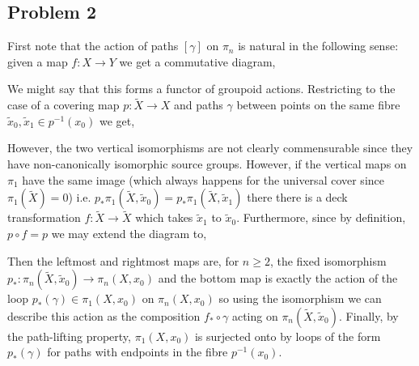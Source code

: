 \documentclass[12pt]{extarticle}
\begin{document}
\subsection{Problem 2}

First note that the action of paths $[\gamma]$ on $\pi_n$ is natural in the following sense: given a map $f : X \to Y$ we get a commutative diagram,
\begin{center}
\end{center}
We might say that this forms a functor of groupoid actions. Restricting to the case of a covering map $p : \tilde{X} \to X$ and paths $\gamma$ between points on the same fibre $\tilde{x}_0, \tilde{x}_1 \in p^{-1}(x_0)$ we get,
\begin{center}
\end{center}
However, the two vertical isomorphisms are not clearly commensurable since they have non-canonically isomorphic source groups. However, if the vertical maps on $\pi_1$ have the same image (which always happens for the universal cover since $\pi_1(\tilde{X}) = 0$) i.e. $p_* \pi_1(\tilde{X}, \tilde{x}_0) = p_* \pi_1(\tilde{X}, \tilde{x}_1)$ there there is a deck transformation $f : \tilde{X} \to \tilde{X}$ which takes $\tilde{x}_1$ to $\tilde{x}_0$. Furthermore, since by definition, $p \circ f = p$ we may extend the diagram to,
\begin{center}
\end{center}
Then the leftmost and rightmost maps are, for $n \ge 2$, the fixed isomorphism $p_* : \pi_n(\tilde{X}, \tilde{x}_0) \to \pi_n(X, x_0)$ and the bottom map is exactly the action of the loop $p_*(\gamma) \in \pi_1(X, x_0)$ on $\pi_n(X, x_0)$ so using the isomorphism we can describe this action as the composition $f_* \circ \gamma$ acting on $\pi_n(\tilde{X}, \tilde{x}_0)$. Finally, by the path-lifting property, $\pi_1(X, x_0)$ is surjected onto by loops of the form $p_*(\gamma)$ for paths with endpoints in the fibre $p^{-1}(x_0)$.
\end{document}
